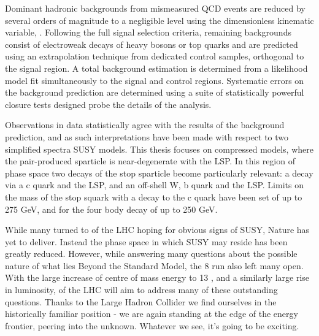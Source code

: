 Dominant hadronic backgrounds from mismeasured QCD events are reduced by
several orders of magnitude to a negligible level using the dimensionless
kinematic variable, \alphat. Following the full signal selection criteria,
remaining backgrounds consist of electroweak decays of
heavy bosons or top quarks and are predicted using an extrapolation technique
from dedicated control samples,
orthogonal to the signal region. A total background estimation is determined
from a likelihood model fit simultaneously to the signal and control
regions. Systematic errors on the background prediction are determined using a
suite of statistically powerful closure tests designed probe the details of the
analysis.

Observations in data statistically agree with the results of the background
prediction, and as such interpretations have been made with respect to two
simplified spectra SUSY models. This thesis focuses on compressed models, where
the pair-produced sparticle is near-degenerate with the LSP. In this region of
phase space two decays of the stop sparticle become particularly relevant: a
decay via a c quark and the LSP, and an off-shell W, b quark and the LSP.
Limits on the mass of the stop squark with a decay to the c quark have been set
of up to 275 GeV, and for the four body decay of up to 250 GeV.

While many turned to \runone of the LHC hoping for obvious signs of SUSY,
Nature has yet to deliver. Instead the phase space in which SUSY may
reside has been greatly reduced. However, while answering many questions about
the possible nature of what lies Beyond the Standard Model, the 8
\tev run also left many open. With the large increase of centre of mass energy
to 13 \tev, and a similarly large rise in luminosity, \runtwo of the LHC will
aim to address many of these outstanding questions. Thanks to the Large Hadron
Collider we find ourselves in the historically familiar position - we are again
standing at the edge of the energy frontier, peering into the unknown. Whatever
we see, it's going to be exciting.
